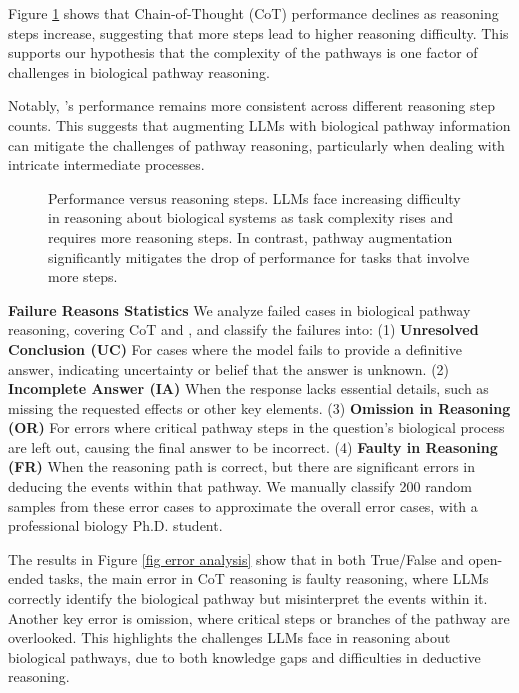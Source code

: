 Figure \ref{fig reasoning step} shows that Chain-of-Thought (CoT) performance declines as reasoning steps increase, suggesting that more steps lead to higher reasoning difficulty. This supports our hypothesis that the complexity of the pathways is one factor of challenges in biological pathway reasoning.

Notably, \modelname's performance remains more consistent across different reasoning step counts. This suggests that augmenting LLMs with biological pathway information can mitigate the challenges of pathway reasoning, particularly when dealing with intricate intermediate processes.


\begin{figure}[!h]
    \centering    
    \renewcommand{\thesubfigure}{} %

    \vspace{-2mm}
    \caption{Performance versus reasoning steps. LLMs face increasing difficulty in reasoning about biological systems as task complexity rises and requires more reasoning steps. In contrast, pathway augmentation significantly mitigates the drop of performance for tasks that involve more steps.}
    \label{fig reasoning step}
    \vspace{-2mm} 
\end{figure}

\textbf{Failure Reasons Statistics} We analyze failed cases in biological pathway reasoning, covering CoT and \modelname, and classify the failures into: (1) \textbf{Unresolved Conclusion (UC)} For cases where the model fails to provide a definitive answer, indicating uncertainty or belief that the answer is unknown.
(2) \textbf{Incomplete Answer (IA)}  When the response lacks essential details, such as missing the requested effects or other key elements.
(3) \textbf{Omission in Reasoning (OR)}  For errors where critical pathway steps in the question's biological process are left out, causing the final answer to be incorrect.
(4) \textbf{Faulty in Reasoning (FR)} When the reasoning path is correct, but there are significant errors in deducing the events within that pathway. We manually classify 200 random samples from these error cases to approximate the overall error cases, with a professional biology Ph.D. student.

The results in Figure \ref{fig error analysis} show that in both True/False and open-ended tasks, the main error in CoT reasoning is faulty reasoning, where LLMs correctly identify the biological pathway but misinterpret the events within it. Another key error is omission, where critical steps or branches of the pathway are overlooked. This highlights the challenges LLMs face in reasoning about biological pathways, due to both knowledge gaps and difficulties in deductive reasoning.

